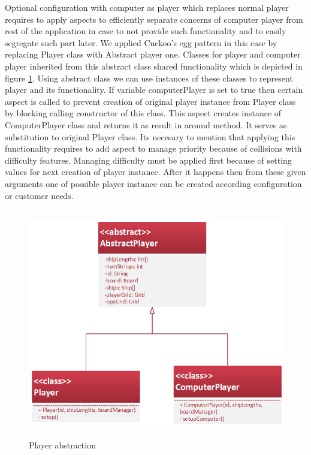 \documentclass[11pt,slovak,a4paper,twoside]{article}
\begin{document}
Optional configuration with computer as player which replaces normal player requires to apply aspects to efficiently separate concerns of computer player from rest of the application in case to not provide such functionality and to easily segregate such part later. We applied Cuckoo's egg pattern in this case by replacing Player class with Abstract player one. Classes for player and computer player inherited from this abstract class shared functionality which is depicted in figure \ref{playerAbstraction}. Using abstract class we can use instances of these classes to represent player and its functionality. If variable computerPlayer is set to true then certain aspect is called to prevent creation of original player instance from Player class by blocking calling constructor of this class. This aspect creates instance of ComputerPlayer class and returns it as result in around method. It serves as substitution to original Player class. Its necesary to mention that applying this functionality requires to add aspect to manage priority because of collisions with difficulty features. Managing difficulty must be applied first because of setting values for next creation of player instance. After it happens then from these given arguments one of possible player instance can be created according configuration or customer needs.   

\begin{figure}[H]  %
					\begin{center}
									\includegraphics[height=10cm]{fig/playerAbstraction.png}
									\caption{Player abstraction}
									\label{playerAbstraction}
					\end{center}
\end{figure}
\end{document}
